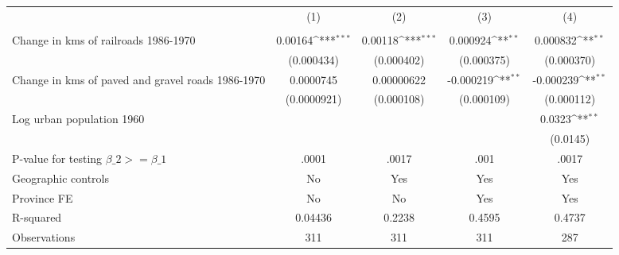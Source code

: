 {
\def\sym#1{\ifmmode^{#1}\else\(^{#1}\)\fi}
\begin{tabular}{l*{4}{c}}
\hline\hline
                &\multicolumn{1}{c}{(1)}&\multicolumn{1}{c}{(2)}&\multicolumn{1}{c}{(3)}&\multicolumn{1}{c}{(4)}\\
                &\multicolumn{1}{c}{}&\multicolumn{1}{c}{}&\multicolumn{1}{c}{}&\multicolumn{1}{c}{}\\
\hline
Change in kms of railroads 1986-1970&  0.00164\sym{***}&  0.00118\sym{***}& 0.000924\sym{**} & 0.000832\sym{**} \\
                &(0.000434)         &(0.000402)         &(0.000375)         &(0.000370)         \\
[1em]
Change in kms of paved and gravel roads 1986-1970&0.0000745         &0.00000622         &-0.000219\sym{**} &-0.000239\sym{**} \\
                &(0.0000921)         &(0.000108)         &(0.000109)         &(0.000112)         \\
[1em]
Log urban population 1960&                  &                  &                  &   0.0323\sym{**} \\
                &                  &                  &                  & (0.0145)         \\
\hline
P-value for testing $\beta\_{2} >= \beta\_{1}$&    .0001         &    .0017         &     .001         &    .0017         \\
Geographic controls&       No         &      Yes         &      Yes         &      Yes         \\
Province FE     &       No         &       No         &      Yes         &      Yes         \\
R-squared       &  0.04436         &   0.2238         &   0.4595         &   0.4737         \\
Observations    &      311         &      311         &      311         &      287         \\
\hline\hline
\end{tabular}
}
